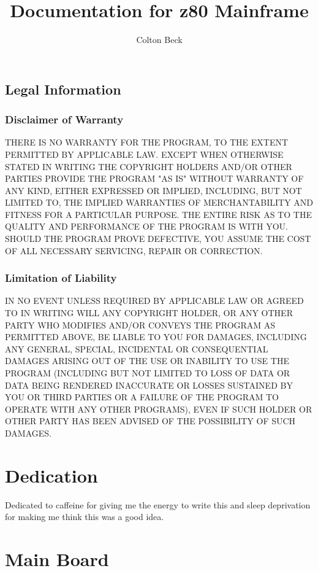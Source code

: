 \documentclass{book}
\begin{document}
\frontmatter
\title{Documentation for z80 Mainframe}
\author{Colton Beck}
\maketitle
\section*{Legal Information}
\subsection*{Disclaimer of Warranty}

  THERE IS NO WARRANTY FOR THE PROGRAM, TO THE EXTENT PERMITTED BY
APPLICABLE LAW.  EXCEPT WHEN OTHERWISE STATED IN WRITING THE COPYRIGHT
HOLDERS AND/OR OTHER PARTIES PROVIDE THE PROGRAM "AS IS" WITHOUT WARRANTY
OF ANY KIND, EITHER EXPRESSED OR IMPLIED, INCLUDING, BUT NOT LIMITED TO,
THE IMPLIED WARRANTIES OF MERCHANTABILITY AND FITNESS FOR A PARTICULAR
PURPOSE.  THE ENTIRE RISK AS TO THE QUALITY AND PERFORMANCE OF THE PROGRAM
IS WITH YOU.  SHOULD THE PROGRAM PROVE DEFECTIVE, YOU ASSUME THE COST OF
ALL NECESSARY SERVICING, REPAIR OR CORRECTION.

\subsection*{Limitation of Liability}

  IN NO EVENT UNLESS REQUIRED BY APPLICABLE LAW OR AGREED TO IN WRITING
WILL ANY COPYRIGHT HOLDER, OR ANY OTHER PARTY WHO MODIFIES AND/OR CONVEYS
THE PROGRAM AS PERMITTED ABOVE, BE LIABLE TO YOU FOR DAMAGES, INCLUDING ANY
GENERAL, SPECIAL, INCIDENTAL OR CONSEQUENTIAL DAMAGES ARISING OUT OF THE
USE OR INABILITY TO USE THE PROGRAM (INCLUDING BUT NOT LIMITED TO LOSS OF
DATA OR DATA BEING RENDERED INACCURATE OR LOSSES SUSTAINED BY YOU OR THIRD
PARTIES OR A FAILURE OF THE PROGRAM TO OPERATE WITH ANY OTHER PROGRAMS),
EVEN IF SUCH HOLDER OR OTHER PARTY HAS BEEN ADVISED OF THE POSSIBILITY OF
SUCH DAMAGES.
\chapter*{Dedication}
Dedicated to caffeine for giving me the energy to write this and sleep deprivation for making me think this was a good idea.
\tableofcontents
\listoffigures
\listoftables
\mainmatter
\chapter{Main Board}
\end{document}
